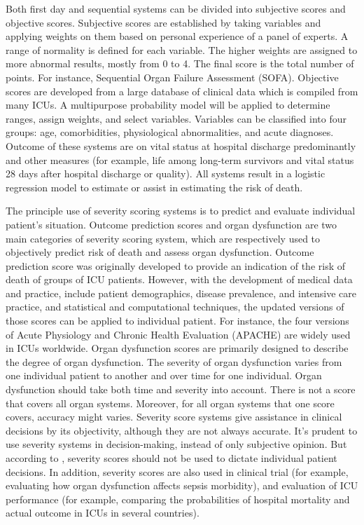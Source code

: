 \documentclass[12pt,a4paper,english
]{tunithesis}
\begin{document}
Both first day and sequential systems can be divided into subjective scores and objective scores. Subjective scores are established by taking variables and applying weights on them based on personal experience of a panel of experts. A range of normality is defined for each variable. The higher weights are assigned to more abnormal results, mostly from 0 to 4. The final score is the total number of points. For instance, Sequential Organ Failure Assessment (SOFA). Objective scores are developed from a large database of clinical data which is compiled from many ICUs. A multipurpose probability model will be applied to determine ranges, assign weights, and select variables. Variables can be classified into four groups: age, comorbidities, physiological abnormalities, and acute diagnoses. Outcome of these systems are on vital status at hospital discharge predominantly and other measures (for example, life among long-term survivors and vital status 28 days after hospital discharge or quality). All systems result in a logistic regression model to estimate or assist in estimating the risk of death. \parencite{LeGall2005, Bouch2008} 

The principle use of severity scoring systems is to predict and evaluate individual patient's situation. Outcome prediction scores and organ dysfunction are two main categories of severity scoring system, which are respectively used to objectively predict risk of death and assess organ dysfunction. Outcome prediction score was originally developed to provide an indication of the risk of death of groups of ICU patients. However, with the development of medical data and practice, include patient demographics, disease prevalence, and intensive care practice, and statistical and computational techniques, the updated versions of those scores can be applied to individual patient. For instance, the four versions of Acute Physiology and Chronic Health Evaluation (APACHE)  are widely used in ICUs worldwide. Organ dysfunction scores are primarily designed to describe the degree of organ dysfunction. The severity of organ dysfunction varies from one individual patient to another and over time for one individual. Organ dysfunction should take both time and severity into account. There is not a score that covers all organ systems. Moreover, for all organ systems that one score covers, accuracy might varies. \parencite{LeGall2005, Bouch2008, Vincent2010} Severity score systems give assistance in clinical decisions by its objectivity, although they are not always accurate. It's prudent to use severity systems in decision-making, instead of only subjective opinion. But according to \textcite{LeGall2005, Vincent2010-at}, severity scores should not be used to dictate individual patient decisions. In addition, severity scores are also used in clinical trial (for example, evaluating how organ dysfunction affects sepsis morbidity), and evaluation of ICU performance (for example, comparing the probabilities of hospital mortality and actual outcome in ICUs in several countries). \parencite{LeGall2005, Vincent2010}
\end{document}
